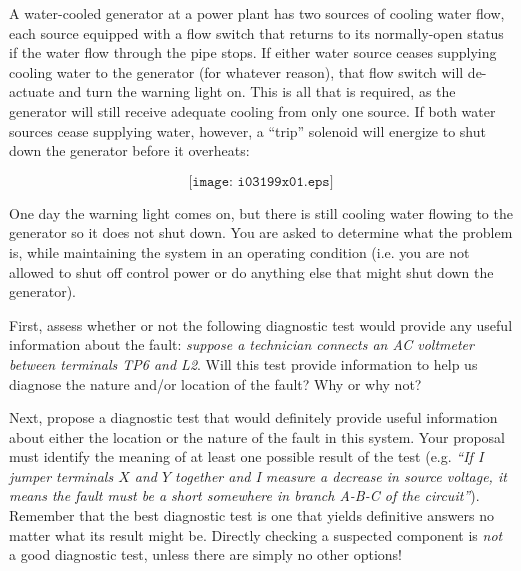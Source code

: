 

A water-cooled generator at a power plant has two sources of cooling water flow, each source equipped with a flow switch that returns to its normally-open status if the water flow through the pipe stops.  If either water source ceases supplying cooling water to the generator (for whatever reason), that flow switch will de-actuate and turn the warning light on.  This is all that is required, as the generator will still receive adequate cooling from only one source.  If both water sources cease supplying water, however, a ``trip'' solenoid will energize to shut down the generator before it overheats:

$$\texttt{[image: i03199x01.eps]}$$

One day the warning light comes on, but there is still cooling water flowing to the generator so it does not shut down.  You are asked to determine what the problem is, while maintaining the system in an operating condition (i.e. you are not allowed to shut off control power or do anything else that might shut down the generator). 

\vskip 10pt

First, assess whether or not the following diagnostic test would provide any useful information about the fault: {\it suppose a technician connects an AC voltmeter between terminals TP6 and L2}.  Will this test provide information to help us diagnose the nature and/or location of the fault?  Why or why not?

\vskip 30pt

Next, propose a diagnostic test that would definitely provide useful information about either the location or the nature of the fault in this system.  Your proposal must identify the meaning of at least one possible result of the test (e.g. {\it ``If I jumper terminals $X$ and $Y$ together and I measure a decrease in source voltage, it means the fault must be a short somewhere in branch A-B-C of the circuit''}).  Remember that the best diagnostic test is one that yields definitive answers no matter what its result might be.  Directly checking a suspected component is {\it not} a good diagnostic test, unless there are simply no other options!




\vfil 

